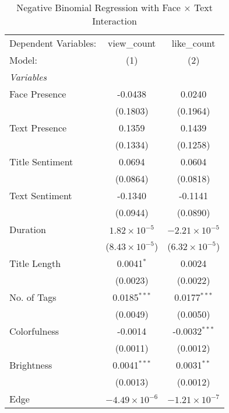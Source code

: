 \begin{table}[htbp]
   \caption{Negative Binomial Regression with Face × Text Interaction}
   \centering
   \begin{tabular}{lcc}
      \tabularnewline \midrule \midrule
      Dependent Variables: & view\_count             & like\_count\\   
      Model:               & (1)                     & (2)\\  
      \midrule
      \emph{Variables}\\
      Face Presence        & -0.0438                 & 0.0240\\   
                           & (0.1803)                & (0.1964)\\   
      Text Presence        & 0.1359                  & 0.1439\\   
                           & (0.1334)                & (0.1258)\\   
      Title Sentiment      & 0.0694                  & 0.0604\\   
                           & (0.0864)                & (0.0818)\\   
      Text Sentiment       & -0.1340                 & -0.1141\\   
                           & (0.0944)                & (0.0890)\\   
      Duration             & $1.82\times 10^{-5}$    & $-2.21\times 10^{-5}$\\    
                           & ($8.43\times 10^{-5}$)  & ($6.32\times 10^{-5}$)\\    
      Title Length         & 0.0041$^{*}$            & 0.0024\\   
                           & (0.0023)                & (0.0022)\\   
      No. of Tags          & 0.0185$^{***}$          & 0.0177$^{***}$\\   
                           & (0.0049)                & (0.0050)\\   
      Colorfulness         & -0.0014                 & -0.0032$^{***}$\\   
                           & (0.0011)                & (0.0012)\\   
      Brightness           & 0.0041$^{***}$          & 0.0031$^{**}$\\   
                           & (0.0013)                & (0.0012)\\   
      Edge                 & $-4.49\times 10^{-6}$   & $-1.21\times 10^{-7}$\\    

\end{tabular}
\end{table}
